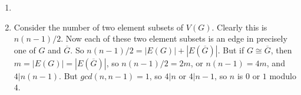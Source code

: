 \begin{enumerate}[a]
	\item
	\item Consider the number of two element subsets of $V(G)$. Clearly this
		is $n(n-1)/2$. Now each of these two element subsets is an edge in precisely
		one of $G$ and $\overline{G}$. So $n(n-1)/2=|E(G)|+|E(\overline{G})|$.
	But if $G \cong \overline{G}$, then $m=|E(G)|=|E(\overline{G})|$, so
	$n(n-1)/2=2m$, or $n(n-1)=4m$, and $4|n(n-1)$. But $gcd(n,n-1)=1$, so $4|n$ or
	$4|n-1$, so $n$ is $0$ or $1$ modulo $4$.
\end{enumerate}
